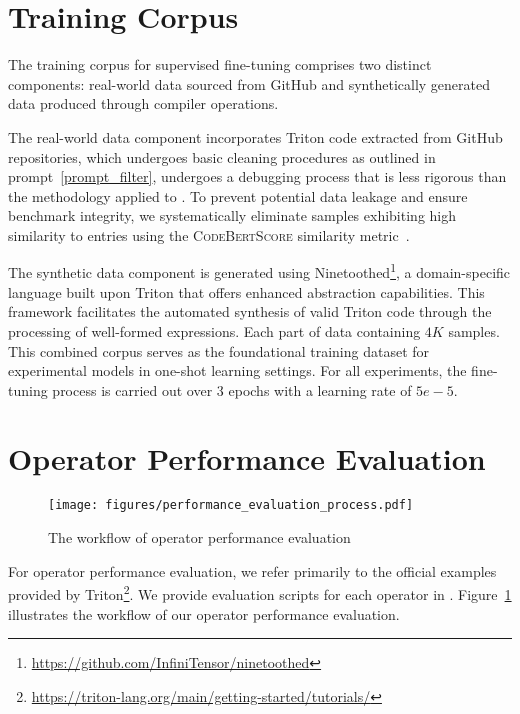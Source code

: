 \appendix
\label{sec:appendix}

\section{Training Corpus}
\label{sec:appendix-trainingcorpus}
The training corpus for supervised fine-tuning comprises two distinct components: real-world data sourced from GitHub and synthetically generated data produced through compiler operations.

The real-world data component incorporates Triton code extracted from GitHub repositories, which undergoes basic cleaning procedures as outlined in prompt~\ref{prompt_filter}, undergoes a debugging process that is less rigorous than the methodology applied to \benchone.
To prevent potential data leakage and ensure benchmark integrity, we systematically eliminate samples exhibiting high similarity to \benchone entries using the \textsc{CodeBertScore} similarity metric~\citep{codebertscore2023}.

The synthetic data component is generated using Ninetoothed\footnote{\href{https://github.com/InfiniTensor/ninetoothed}{https://github.com/InfiniTensor/ninetoothed}}, a domain-specific language built upon Triton that offers enhanced abstraction capabilities. This framework facilitates the automated synthesis of valid Triton code through the processing of well-formed expressions.
Each part of data containing $4K$ samples. This combined corpus serves as the foundational training dataset for experimental models in one-shot learning settings. For all experiments, the fine-tuning process is carried out over $3$ epochs with a learning rate of $5e-5$. 

\section{Operator Performance Evaluation}
\label{sec:appendix-performance_eval}
\begin{figure}
    \centering
    \texttt{[image: figures/performance\_evaluation\_process.pdf]}
    \caption{The workflow of operator performance evaluation}
    \label{fig:performance_evaluation_metrics}
\end{figure}

For operator performance evaluation, we refer primarily to the official examples provided by Triton\footnote{\href{https://triton-lang.org/main/getting-started/tutorials/}{https://triton-lang.org/main/getting-started/tutorials/}}. 
We provide evaluation scripts for each operator in \benchone.
Figure~\ref{fig:performance_evaluation_metrics} illustrates the workflow of our operator performance evaluation.

